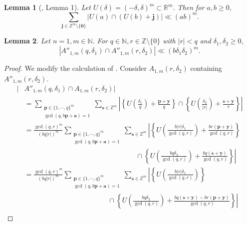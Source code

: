 \documentclass[reqno]{amsart}
\newtheorem{lemma}{Lemma}
\theoremstyle{definition}
\theoremstyle{remark}
\begin{document}
\begin{lemma}[\cite{Gal65}, Lemma 1]\label{gallagher}
    Let $U(\delta) = (-\delta,\delta)^m \subset \mathbb{R}^m$. Then for $a,b \geq 0$,
    $$\sum_{\mathbf{j} \in \mathbb{Z}^m \setminus \{\mathbf{0}\}} |U(a) \cap (U(b)+\mathbf{j})| \ll (ab)^m.$$
\end{lemma}
\begin{lemma}\label{rationalqia}
    Let $n=1, m \in \mathbb{N}.$ For $q \in \mathbb{N} , r \in \mathbb{Z}\setminus \{0\}$ with $|r|<q$ and $\delta_1, \delta_2 \geq 0$,
    $$|A''_{1,m}(q, \delta_1)\cap A''_{1,m}(r,\delta_2)| \ll (b\delta_1\delta_2)^m.$$
\end{lemma}
\begin{proof}
    We modify the calculation of \cite{Gal65}. Consider $A_{1,m}(r,\delta_2)$ containing $A''_{1,m}(r,\delta_2)$.
    \begin{align*}
        |&A''_{1,m}(q, \delta_1) \cap A_{1,m}(r,\delta_2)| \\
        &= \sum_{\substack{\mathbf{p} \in \{1, \cdots, q\}^m \\ \gcd(q, b\mathbf{p} + \mathbf{a}) = 1}} \sum_{\mathbf{s} \in \mathbb{Z}^m} \left|\left\{U\left(\frac{\delta_1}{q}\right) + \frac{\mathbf{p} + \mathbf{y}}{q}\right\} \cap \left\{U\left(\frac{\delta_2}{|r|}\right) + \frac{\mathbf{s} + \mathbf{y}}{r}\right\}\right| \\
        &= \frac{\gcd(q,r)^m}{(bq|r|)^m} \sum_{\substack{\mathbf{p} \in \{1, \cdots, q\}^m \\ \gcd(q, b\mathbf{p} + \mathbf{a}) = 1}} \sum_{\mathbf{s} \in \mathbb{Z}^m} \left|\left\{ U\left(\frac{b|r|\delta_1}{\gcd(q,r)}\right) + \frac{br(\mathbf{p} + \mathbf{y})}{\gcd(q,r)} \right\} \right.\\ 
        &\qquad \qquad \qquad \qquad \qquad \qquad \qquad \qquad \cap \left. \left\{U\left(\frac{bq\delta_2}{\gcd(q,r)}\right) + \frac{bq(\mathbf{s} + \mathbf{y})}{\gcd(q,r)}\right\}\right| \\
        &= \frac{\gcd(q,r)^m}{(bq|r|)^m} \sum_{\substack{\mathbf{p} \in \{1, \cdots, q\}^m \\ \gcd(q, b\mathbf{p} + \mathbf{a}) = 1}} \sum_{\mathbf{s} \in \mathbb{Z}^m} \left|\left\{ U\left(\frac{b|r|\delta_1}{\gcd(q,r)}\right)\right\} \right.\\ 
        &\qquad \qquad \qquad \qquad \qquad \qquad \cap \left. \left\{U\left(\frac{bq\delta_2}{\gcd(q,r)}\right) + \frac{bq(\mathbf{s} + \mathbf{y}) - br(\mathbf{p} + \mathbf{y})}{\gcd(q,r)}\right\}\right| \\

\end{align*}
\end{proof}
\end{document}
